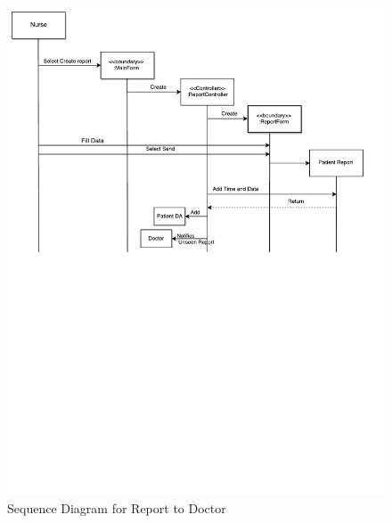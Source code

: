 \documentclass[14pt]{article}
\begin{document}
\newpage
\begin{figure}[h!]
\centering
  \caption{Sequence Diagram for Report to Doctor}
  \includegraphics[width=14.5cm]{sequenceDiagram.pdf}
\end{figure}
\newpage 
\end{document}
